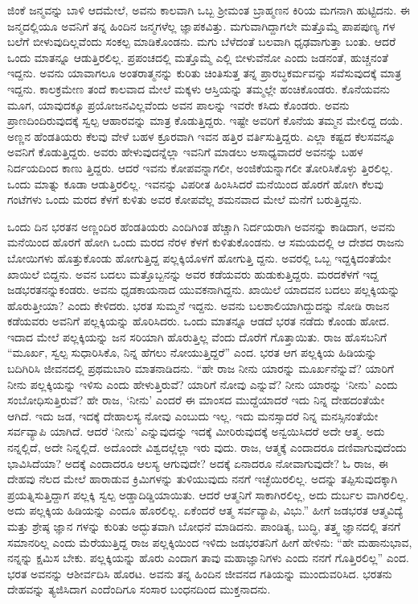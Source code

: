 ಜಿಂಕೆ ಜನ್ಮವನ್ನು ಬಾಳಿ ಆದಮೇಲೆ, ಅವನು ಕಾಲವಾಗಿ ಒಬ್ಬ ಶ‍್ರೀಮಂತ ಬ್ರಾಹ್ಮಣನ ಕಿರಿಯ ಮಗನಾಗಿ ಹುಟ್ಟಿದನು. ಈ ಜನ್ಮದಲ್ಲಿಯೂ ಅವನಿಗೆ ತನ್ನ ಹಿಂದಿನ ಜನ್ಮಗಳೆಲ್ಲ ಜ್ಞಾಪಕವಿತ್ತು. ಮಗುವಾಗಿದ್ದಾಗಲೇ ಮತ್ತೊಮ್ಮೆ ಪಾಪಪುಣ್ಯ ಗಳ ಬಲೆಗೆ ಬೀಳುವುದಿಲ್ಲವೆಂದು ಸಂಕಲ್ಪ ಮಾಡಿಕೊಂಡನು. ಮಗು ಬೆಳೆದಂತೆ ಬಲವಾಗಿ ಧೃಢವಾಗುತ್ತಾ ಬಂತು. ಆದರೆ ಒಂದು ಮಾತನ್ನೂ ಆಡುತ್ತಿರಲಿಲ್ಲ. ಪ್ರಪಂಚದಲ್ಲಿ ಮತ್ತೊಮ್ಮೆ ಎಲ್ಲಿ ಬೀಳುವೆನೋ ಎಂದು ಜಡನಂತೆ, ಹುಚ್ಚನಂತೆ ಇದ್ದನು. ಅವನು ಯಾವಾಗಲೂ ಅಂತರಾತ್ಮನನ್ನು ಕುರಿತು ಚಿಂತಿಸುತ್ತ ತನ್ನ ಪ್ರಾರಬ್ಧಕರ್ಮವನ್ನು ಸವೆಸುವುದಕ್ಕೆ ಮಾತ್ರ ಇದ್ದನು. ಕಾಲಕ್ರಮೇಣ ತಂದೆ ಕಾಲವಾದ ಮೇಲೆ ಮಕ್ಕಳು ಆಸ್ತಿಯನ್ನು ತಮ್ಮಲ್ಲೇ ಹಂಚಿಕೊಂಡರು. ಕೊನೆಯವನು ಮೂಗ, ಯಾವುದಕ್ಕೂ ಪ್ರಯೋಜನವಿಲ್ಲವೆಂದು ಅವನ ಪಾಲನ್ನು ಇವರೇ ಕಸಿದು ಕೊಂಡರು. ಅವನು ಪ್ರಾಣದಿಂದಿರುವುದಕ್ಕೆ ಸ್ವಲ್ಪ ಆಹಾರವನ್ನು ಮಾತ್ರ ಕೊಡುತ್ತಿದ್ದರು. ಇಷ್ಟೇ ಅವರಿಗೆ ಕೊನೆಯ ತಮ್ಮನ ಮೇಲಿದ್ದ ದಯೆ. ಅಣ್ಣನ ಹೆಂಡತಿಯರು ಕೆಲವು ವೇಳೆ ಬಹಳ ಕ್ರೂರವಾಗಿ ಇವನ ಹತ್ತಿರ ವರ್ತಿಸುತ್ತಿದ್ದರು. ಎಲ್ಲಾ ಕಷ್ಟದ ಕೆಲಸವನ್ನೂ ಅವನಿಗೆ ಕೊಡುತ್ತಿದ್ದರು. ಅವರು ಹೇಳುವುದನ್ನೆಲ್ಲಾ ಇವನಿಗೆ ಮಾಡಲು ಅಸಾಧ್ಯವಾದರೆ ಅವನನ್ನು ಬಹಳ ನಿರ್ದಯದಿಂದ ಕಾಣು ತ್ತಿದ್ದರು. ಆದರೆ ಇವನು ಕೋಪವನ್ನಾಗಲೀ, ಅಂಜಿಕೆಯನ್ನಾಗಲೀ ತೋರಿಸಿಕೊಳ್ಳು ತ್ತಿರಲಿಲ್ಲ. ಒಂದು ಮಾತ್ನು ಕೂಡಾ ಆಡುತ್ತಿರಲಿಲ್ಲ. ಇವನನ್ನು ವಿಪರೀತ ಹಿಂಸಿಸಿದರೆ ಮನೆಯಿಂದ ಹೊರಗೆ ಹೋಗಿ ಕೆಲವು ಗಂಟೆಗಳು ಒಂದು ಮರದ ಕೆಳಗೆ ಕುಳಿತು ಅವರ ಕೋಪವೆಲ್ಲ ಶಮನವಾದ ಮೇಲೆ ಮನೆಗೆ ಬರುತ್ತಿದ್ದನು.

ಒಂದು ದಿನ ಭರತನ ಅಣ್ಣಂದಿರ ಹೆಂಡತಿಯರು ಎಂದಿಗಿಂತ ಹೆಚ್ಚಾಗಿ ನಿರ್ದಯರಾಗಿ ಅವನನ್ನು ಕಾಡಿದಾಗ, ಅವನು ಮನೆಯಿಂದ ಹೊರಗೆ ಹೋಗಿ ಒಂದು ಮರದ ನೆರಳ ಕೆಳಗೆ ಕುಳಿತುಕೊಂಡನು. ಆ ಸಮಯದಲ್ಲಿ ಆ ದೇಶದ ರಾಜನು ಬೋಯಿಗಳು ಹೊತ್ತುಕೊಂಡು ಹೋಗುತ್ತಿದ್ದ ಪಲ್ಲಕ್ಕಿಯೊಳಗೆ ಹೋಗುತ್ತಿ ದ್ದನು. ಅವರಲ್ಲಿ ಒಬ್ಬ ಇದ್ದಕ್ಕಿದಂತೆಯೇ ಖಾಯಿಲೆ ಬಿದ್ದನು. ಅವನ ಬದಲು ಮತ್ತೊಬ್ಬನನ್ನು ಅವರ ಕಡೆಯವರು ಹುಡುಕುತ್ತಿದ್ದರು. ಮರದಕೆಳಗೆ ಇದ್ದ ಜಡಭರತನನ್ನುಕಂಡರು. ಅವನು ಧೃಡಕಾಯನಾದ ಯುವಕನಾಗಿದ್ದನು. ಖಾಯಿಲೆ ಯಾದವನ ಬದಲು ಪಲ್ಲಕ್ಕಿಯನ್ನು ಹೊರುತ್ತೀಯಾ? ಎಂದು ಕೇಳಿದರು. ಭರತ ಸುಮ್ಮನೆ ಇದ್ದನು. ಅವನು ಬಲಶಾಲಿಯಾಗಿದ್ದುದನ್ನು ನೋಡಿ ರಾಜನ ಕಡೆಯವರು ಅವನಿಗೆ ಪಲ್ಲಕ್ಕಿಯನ್ನು ಹೊರಿಸಿದರು. ಒಂದು ಮಾತನ್ನೂ ಆಡದೆ ಭರತ ನಡೆದು ಕೊಂಡು ಹೋದ. ಇದಾದ ಮೇಲೆ ಪಲ್ಲಕ್ಕಿಯನ್ನು ಜನ ಸರಿಯಾಗಿ ಹೊರುತ್ತಿಲ್ಲ ವೆಂದು ದೊರೆಗೆ ಗೊತ್ತಾಯಿತು. ರಾಜ ಹೊಸಬನಿಗೆ “ಮೂರ್ಖ, ಸ್ವಲ್ಪ ಸುಧಾರಿಸಿಕೊ, ನಿನ್ನ ಹೆಗಲು ನೋಯುತ್ತಿದ್ದರೆ” ಎಂದ. ಭರತ ಆಗ ಪಲ್ಲಕ್ಕಿಯ ಹಿಡಿಯನ್ನು ಬದಿಗಿರಿಸಿ ಜೀವನದಲ್ಲಿ ಪ್ರಥಮಬಾರಿ ಮಾತನಾಡಿದನು. “ಹೇ ರಾಜ ನೀನು ಯಾರನ್ನು ಮೂರ್ಖನೆನ್ನುವೆ? ಯಾರಿಗೆ ನೀನು ಪಲ್ಲಕ್ಕಿಯನ್ನು ಇಳಿಸು ಎಂದು ಹೇಳುತ್ತಿರುವೆ? ಯಾರಿಗೆ ನೋವು ಎನ್ನುವೆ? ನೀನು ಯಾರನ್ನು ‘ನೀನು’ ಎಂದು ಸಂಬೋಧಿಸುತ್ತಿರುವೆ? ಹೇ ರಾಜ, ‘ನೀನು’ ಎಂದರೆ ಈ ಮಾಂಸದ ಮುದ್ದೆಯಾದರೆ ಇದು ನಿನ್ನ ದೇಹದಂತೆಯೇ ಆಗಿದೆ. ಇದು ಜಡ, ಇದಕ್ಕೆ ದೇಹಾಲಸ್ಯ ನೋವು ಎಂಬುದು ಇಲ್ಲ. ಇದು ಮನಸ್ಸಾದರೆ ನಿನ್ನ ಮನಸ್ಸಿನಂತೆಯೇ ಸರ್ವವ್ಯಾಪಿ ಯಾಗಿದೆ. ಆದರೆ ‘ನೀನು’ ಎನ್ನುವುದನ್ನು ಇದಕ್ಕೆ ಮೀರಿರುವುದಕ್ಕೆ ಅನ್ವಯಿಸಿದರೆ ಅದೇ ಆತ್ಮ. ಅದು ನನ್ನಲ್ಲಿದೆ, ಅದೇ ನಿನ್ನಲ್ಲಿದೆ. ಅದೊಂದೇ ವಿಶ್ವದಲ್ಲೆಲ್ಲಾ ಇರು ವುದು. ರಾಜ, ಆತ್ಮಕ್ಕೆ ಎಂದಾದರೂ ದಣಿವಾಗುವುದೆಂದು ಭಾವಿಸಿದೆಯಾ? ಅದಕ್ಕೆ ಎಂದಾದರೂ ಆಲಸ್ಯ ಆಗುವುದೇ? ಅದಕ್ಕೆ ಏನಾದರೂ ನೋವಾಗುವುದೇ? ಓ ರಾಜ, ಈ ದೇಹವು ನೆಲದ ಮೇಲೆ ಹಾರಾಡುವ ಕ್ರಿಮಿಗಳನ್ನು ತುಳಿಯುವುದು ನನಗೆ ಇಚ್ಛೆಯಿರಲಿಲ್ಲ. ಅದನ್ನು ತಪ್ಪಿಸುವುದಕ್ಕಾಗಿ ಪ್ರಯತ್ನಿಸುತ್ತಿದ್ದಾಗ ಪಲ್ಲಕ್ಕಿ ಸ್ವಲ್ಪ ಅಡ್ಡಾದಿಡ್ಡಿಯಾಯಿತು. ಆದರೆ ಆತ್ಮನಿಗೆ ಸಾಕಾಗಿರಲಿಲ್ಲ, ಅದು ದುರ್ಬಲ ವಾಗಿರಲಿಲ್ಲ. ಅದು ಪಲ್ಲಕ್ಕಿಯ ಹಿಡಿಯನ್ನು ಎಂದೂ ಹೊರಲಿಲ್ಲ. ಏಕೆಂದರೆ ಆತ್ಮ ಸರ್ವವ್ಯಾಪಿ, ವಿಭು.” ಹೀಗೆ ಜಡಭರತ ಆತ್ಮವಿದ್ಯೆ ಮತ್ತು ಶ್ರೇಷ್ಠ ಜ್ಞಾನ ಗಳನ್ನು ಕುರಿತು ಅದ್ಭುತವಾಗಿ ಬೋಧನೆ ಮಾಡಿದನು. ಪಾಂಡಿತ್ಯ, ಬುದ್ಧಿ, ತತ್ತ್ವ ಜ್ಞಾನದಲ್ಲಿ ತನಗೆ ಸಮಾನರಿಲ್ಲ ಎಂದು ಮೆರೆಯುತ್ತಿದ್ದ ರಾಜ ಪಲ್ಲಕ್ಕಿಯಿಂದ ಇಳಿದು ಜಡಭರತನಿಗೆ ಹೀಗೆ ಹೇಳಿನು: “ಹೇ ಮಹಾನುಭಾವ, ನನ್ನನ್ನು ಕ್ಷಮಿಸ ಬೇಕು. ಪಲ್ಲಕ್ಕಿಯನ್ನು ಹೊರು ಎಂದಾಗ ತಾವು ಮಹಾಜ್ಞಾನಿಗಳು ಎಂದು ನನಗೆ ಗೊತ್ತಿರಲಿಲ್ಲ” ಎಂದ. ಭರತ ಅವನನ್ನು ಆಶೀರ್ವದಿಸಿ ಹೊರಟ. ಅವನು ತನ್ನ ಹಿಂದಿನ ಜೀವನದ ಗತಿಯನ್ನು ಮುಂದುವರಿಸಿದ. ಭರತನು ದೇಹವನ್ನು ತ್ಯಜಿಸಿದಾಗ ಎಂದೆಂದಿಗೂ ಸಂಸಾರ ಬಂಧನದಿಂದ ಮುಕ್ತನಾದನು.


